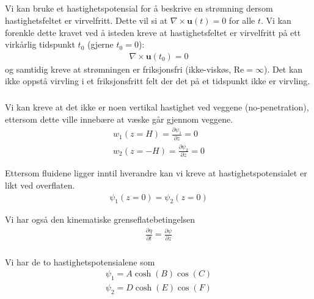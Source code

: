 \documentclass[12p,a4paper]{article}
\renewcommand{\b}{\boldsymbol}
\begin{document}
\subsection{}
\subsubsection{}
Vi kan bruke et hastighetspotensial for å beskrive en strømning dersom hastighetsfeltet er virvelfritt. Dette vil si at $\nabla \times \b u(t) = 0$ for alle $t$. Vi kan forenkle dette kravet ved å isteden kreve at hastighetsfeltet er virvelfritt på ett virkårlig tidspunkt $t_0$ (gjerne $t_0=0$):
\begin{align*}
    \nabla \times \b u(t_0) = 0
\end{align*}
og samtidig kreve at strømningen er friksjonsfri (ikke-viskøs, $\mathrm{Re} = \infty$). Det kan ikke oppstå virvling i et friksjonsfritt felt der det på et tidspunkt ikke er virvling.


\subsubsection{}
Vi kan kreve at det ikke er noen vertikal hastighet ved veggene (no-penetration), ettersom dette ville innebære at væske går gjennom veggene.
\begin{align}
    w_1(z = H) = \frac{\partial \psi_1}{\partial z} = 0 \\
    w_2(z = -H) = \frac{\partial \psi_2}{\partial z} = 0
\end{align}

Ettersom fluidene ligger inntil hverandre kan vi kreve at hastighetspotensialet er likt ved overflaten.
\begin{align}
    \psi_1(z=0) = \psi_2(z=0)
\end{align}

Vi har også den kinematiske grenseflatebetingelsen
\begin{align}
    \frac{\partial \eta}{\partial t} = \frac{\partial \psi}{\partial z}
\end{align}


\subsubsection{}
Vi har de to hastighetspotensialene som
\begin{align*}
    \psi_1 = A\cosh(B)\cos(C) \\
    \psi_2 = D\cosh(E)\cos(F)
\end{align*}
\end{document}
